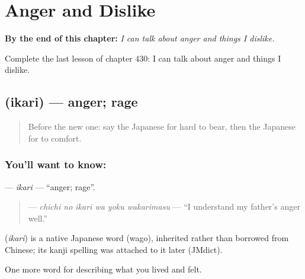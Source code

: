 
\chapter{Anger and Dislike}
\label{ch:ja-anger-and-dislike}

\begin{chapteropening}
\textbf{By the end of this chapter:} \emph{I can talk about anger and things I dislike.}

Complete the last lesson of chapter 430: I can talk about anger and things I dislike.
\end{chapteropening}

\section[\texorpdfstring{\ja{いかり} (ikari)}{いかり (ikari)}]{ (ikari) — anger; rage}

\label{lesson:JA-C430-ikari}



\begin{quote}
Before the new one: say the Japanese for hard to bear, then the Japanese for to comfort.
\end{quote}

\subsection*{You'll want to know: }
\textbf{} — \emph{ikari} — \textquotedblleft{}anger; rage\textquotedblright{}.

\begin{quote}
\textbf{   } — \emph{chichi no ikari wa yoku wakarimasu} — \textquotedblleft{}I understand my father's anger well.\textquotedblright{}
\end{quote}

\begin{cousinweb}
\textbf{} (\emph{ikari}) is a native Japanese word (wago), inherited rather than borrowed from Chinese; its kanji spelling was attached to it later (JMdict).
\end{cousinweb}

\begin{grammarlens}[title={What you've built}]
One more word for describing what you lived and felt.
\end{grammarlens}

